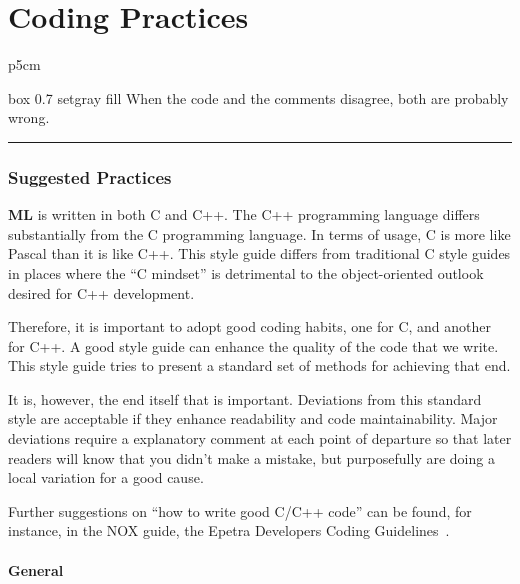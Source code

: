 \documentclass[10pt,letter,relax]{SANDreport}
\newcommand{\HRule}{\noindent\rule{\linewidth}{1mm}}
\newcommand{\ML}     {{\bf ML }}
\begin{document}
\part{Coding Practices}

\medskip

\hfill
\begin{tabular}{p{5cm}}
\begin{boxitpara}{box 0.7 setgray fill}
When the code and the comments disagree, both are probably wrong.
\end{boxitpara}
\end{tabular}

\HRule
\clearpage
\newpage


\section{Suggested Practices}
\label{sec:code}

\ML is written in both C and C++.
The C++ programming language differs substantially from the C
programming language. In terms of usage, C is more like Pascal than it
is like C++. This style guide differs from traditional C style guides in
places where the ``C mindset'' is detrimental to the object-oriented
outlook desired for C++ development.

Therefore, it is important to adopt good coding habits, one for C, and
another for C++. A good style guide can enhance the quality of the code
that we write.  This style guide tries to present a standard set of
methods for achieving that end.

It is, however, the end itself that is important. Deviations from this
standard style are acceptable if they enhance readability and code
maintainability. Major deviations require a explanatory comment at each
point of departure so that later readers will know that you didn't make
a mistake, but purposefully are doing a local variation for a good
cause.

Further suggestions on ``how to write good C/C++ code'' can be found,
for instance, in the NOX guide, the Epetra Developers Coding
Guidelines~\cite{Epetra-Dev-Guide}.

\subsection{General}
\end{document}
